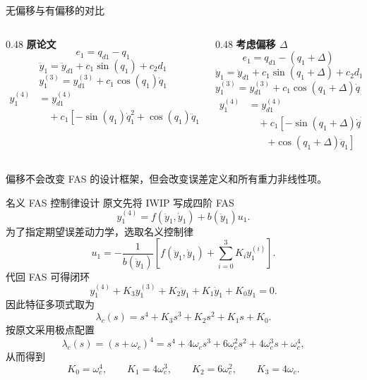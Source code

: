 \begin{frame}{无偏移与有偏移的对比}
    \scriptsize
    \begin{columns}[T]
        \begin{column}{0.48\textwidth}
            \textbf{原论文}
            \[
            e_1 = q_{d1} - q_1
            \]
            \[
            \ddot y_1 = \ddot y_{d1} + c_1 \sin(q_1) + c_2 d_1
            \]
            \[
            y_1^{(3)} = y_{d1}^{(3)} + c_1 \cos(q_1)\dot q_1
            \]
            \[
            \begin{aligned}
            y_1^{(4)} &= y_{d1}^{(4)} \\
            &\quad + c_1\!\left[
            -\sin(q_1)\dot q_1^2
            + \cos(q_1)\ddot q_1
            \right]
            \end{aligned}
            \]
        \end{column}
        \begin{column}{0.48\textwidth}
            \textbf{考虑偏移 $\Delta$}
            \[
            e_1 = q_{d1} - (q_1+\Delta)
            \]
            \[
            \ddot y_1 = \ddot y_{d1} + c_1 \sin(q_1+\Delta) + c_2 d_1
            \]
            \[
            y_1^{(3)} = y_{d1}^{(3)} + c_1 \cos(q_1+\Delta)\dot q_1
            \]
            \[
            \begin{aligned}
            y_1^{(4)} &= y_{d1}^{(4)} \\
            &\quad + c_1\!\left[
            -\sin(q_1+\Delta)\dot q_1^2 \right.\\
            &\qquad\left. + \cos(q_1+\Delta)\ddot q_1
            \right]
            \end{aligned}
            \]
        \end{column}
    \end{columns}
    偏移不会改变 FAS 的设计框架，但会改变误差定义和所有重力非线性项。
\end{frame}

\begin{frame}{名义 FAS 控制律设计}
    \scriptsize
    原文先将 IWIP 写成四阶 FAS
    \[
    y_1^{(4)} = f(\ddot y_1,\dot y_1) + b(\ddot y_1)u_1.
    \]
    为了指定期望误差动力学，选取名义控制律
    \[
    u_1 =
    -\frac{1}{b(\ddot y_1)}
    \left[
    f(\ddot y_1,\dot y_1) + \sum_{i=0}^{3} K_i y_1^{(i)}
    \right].
    \]
    代回 FAS 可得闭环
    \[
    y_1^{(4)} + K_3 y_1^{(3)} + K_2 \ddot y_1 + K_1 \dot y_1 + K_0 y_1 = 0.
    \]
    因此特征多项式取为
    \[
    \lambda_c(s)=s^4+K_3 s^3+K_2 s^2+K_1 s+K_0.
    \]
    按原文采用极点配置
    \[
    \lambda_c(s)=(s+\omega_c)^4
    = s^4 + 4\omega_c s^3 + 6\omega_c^2 s^2 + 4\omega_c^3 s + \omega_c^4,
    \]
    从而得到
    \[
    K_0=\omega_c^4,\qquad
    K_1=4\omega_c^3,\qquad
    K_2=6\omega_c^2,\qquad
    K_3=4\omega_c.
    \]
\end{frame}

